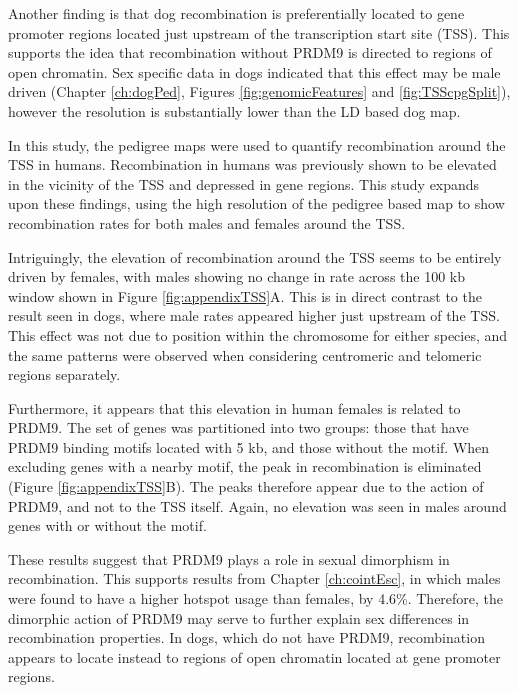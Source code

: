 Another finding is that dog recombination is preferentially located to gene promoter regions located just upstream of the transcription start site (TSS)\cite{Auton2013}.
This supports the idea that recombination without PRDM9 is directed to regions of open chromatin.
Sex specific data in dogs indicated that this effect may be male driven (Chapter \ref{ch:dogPed}, Figures \ref{fig:genomicFeatures} and \ref{fig:TSScpgSplit}), however the resolution is substantially lower than the LD based dog map.

In this study, the pedigree maps were used to quantify recombination around the TSS in humans.
Recombination in humans was previously shown to be elevated in the vicinity of the TSS and depressed in gene regions\cite{Mcvean2004,Myers2005,hapmap2007,Kong2010}.
This study expands upon these findings, using the high resolution of the pedigree based map to show recombination rates for both males and females around the TSS.

Intriguingly, the elevation of recombination around the TSS seems to be entirely driven by females, with males showing no change in rate across the 100 kb window shown in Figure \ref{fig:appendixTSS}A.
This is in direct contrast to the result seen in dogs, where male rates appeared higher just upstream of the TSS.
This effect was not due to position within the chromosome for either species, and the same patterns were observed when considering centromeric and telomeric regions separately.

Furthermore, it appears that this elevation in human females is related to PRDM9.
The set of genes was partitioned into two groups: those that have PRDM9 binding motifs located with 5 kb, and those without the motif.
When excluding genes with a nearby motif, the peak in recombination is eliminated (Figure \ref{fig:appendixTSS}B).
The peaks therefore appear due to the action of PRDM9, and not to the TSS itself.
Again, no elevation was seen in males around genes with or without the motif.

These results suggest that PRDM9 plays a role in sexual dimorphism in recombination.
This supports results from Chapter \ref{ch:cointEsc}, in which males were found to have a higher hotspot usage than females, by 4.6\%.
Therefore, the dimorphic action of PRDM9 may serve to further explain sex differences in recombination properties.
In dogs, which do not have PRDM9, recombination appears to locate instead to regions of open chromatin located at gene promoter regions.


